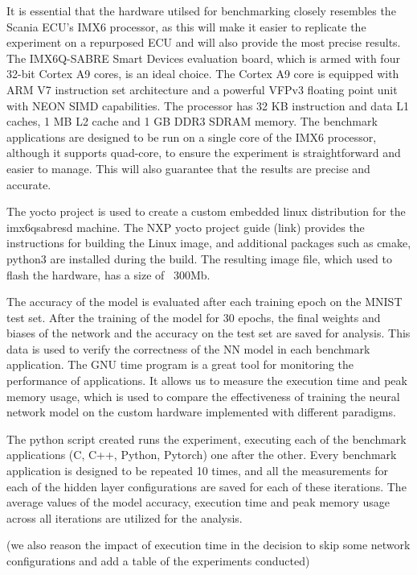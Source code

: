 It is essential that the hardware utilsed for benchmarking closely resembles the Scania ECU's IMX6 processor, as this will make it easier to replicate the experiment on a repurposed ECU and will also provide the most precise results. The IMX6Q-SABRE Smart Devices evaluation board, which is armed with four 32-bit Cortex A9 cores, is an ideal choice. The Cortex A9 core is equipped with ARM V7 instruction set architecture and a powerful VFPv3 floating point unit with NEON SIMD capabilities. The processor has 32 KB instruction and data L1 caches, 1 MB L2 cache and 1 GB DDR3 SDRAM memory. The benchmark applications are designed to be run on a single core of the IMX6 processor, although it supports quad-core, to ensure the experiment is straightforward and easier to manage. This will also guarantee that the results are precise and accurate.

The yocto project is used to create a custom embedded linux distribution for the imx6qsabresd machine. The NXP yocto project guide (link) provides the instructions for building the Linux image, and additional packages such as cmake, python3 are installed during the build. The resulting image file, which used to flash the hardware, has a size of ~300Mb.    

The accuracy of the model is evaluated after each training epoch on the MNIST test set. After the training of the model for 30 epochs, the final weights and biases of the network and the accuracy on the test set are saved for analysis. This data is used to verify the correctness of the NN model in each benchmark application.
The GNU time program is a great tool for monitoring the performance of applications. It allows us to measure the execution time and peak memory usage, which is used to compare the effectiveness of training the neural network model on the custom hardware implemented with different paradigms.

The python script created runs the experiment, executing each of the benchmark applications (C, C++, Python, Pytorch) one after the other. Every benchmark application is designed to be repeated 10 times, and all the measurements for each of the hidden layer configurations are saved for each of these iterations. The average values of the model accuracy, execution time and peak memory usage across all iterations are utilized for the analysis.

(we also reason the impact of execution time in the decision to skip some network configurations and add a table of the experiments conducted)



